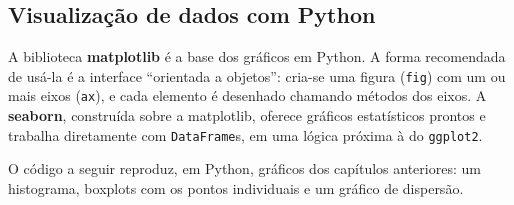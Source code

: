 \documentclass[
]{book}
\begin{document}
\subsection{Visualização de dados com Python}\label{visualizauxe7uxe3o-de-dados-com-python}

A biblioteca \textbf{matplotlib} é a base dos gráficos em Python. A forma recomendada de usá-la é a interface ``orientada a objetos'': cria-se uma figura (\texttt{fig}) com um ou mais eixos (\texttt{ax}), e cada elemento é desenhado chamando métodos dos eixos. A \textbf{seaborn}, construída sobre a matplotlib, oferece gráficos estatísticos prontos e trabalha diretamente com \texttt{DataFrame}s, em uma lógica próxima à do \texttt{ggplot2}.

O código a seguir reproduz, em Python, gráficos dos capítulos anteriores: um histograma, boxplots com os pontos individuais e um gráfico de dispersão.
\end{document}
